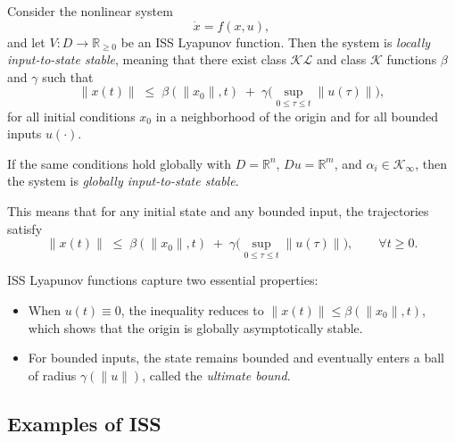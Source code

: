 \begin{theorem}
Consider the nonlinear system
\begin{equation}
    \dot{x} = f(x,u),
\end{equation}
and let $V:D\to\mathbb{R}_{\ge 0}$ be an ISS Lyapunov function. Then the system is 
\emph{locally input-to-state stable}, meaning that there exist class $\mathcal{KL}$ 
and class $\mathcal{K}$ functions $\beta$ and $\gamma$ such that
\begin{equation}
    \|x(t)\| \;\leq\; \beta(\|x_0\|,t) \;+\; 
    \gamma\!\Big(\sup_{0\le \tau \le t}\|u(\tau)\|\Big),
\end{equation}
for all initial conditions $x_0$ in a neighborhood of the origin and for all bounded 
inputs $u(\cdot)$.  
\end{theorem}

\begin{theorem}
If the same conditions hold globally with $D = \mathbb{R}^n$, $Du = \mathbb{R}^m$, 
and $\alpha_i \in \mathcal{K}_\infty$, then the system is 
\emph{globally input-to-state stable}.  

This means that for any initial state and any bounded input, the trajectories satisfy
\begin{equation}
\|x(t)\| \;\leq\; \beta(\|x_0\|,t) \;+\; 
\gamma\!\Big(\sup_{0\le \tau \le t}\|u(\tau)\|\Big), 
\qquad \forall t\ge 0.
\end{equation}
\end{theorem}

\begin{remark}
ISS Lyapunov functions capture two essential properties:
\begin{itemize}
    \item When $u(t)\equiv 0$, the inequality reduces to 
    $\|x(t)\|\leq \beta(\|x_0\|,t)$, which shows that the origin is globally asymptotically stable.
    \item For bounded inputs, the state remains bounded and eventually enters a ball of radius $\gamma(\|u\|)$, called the \emph{ultimate bound}.
\end{itemize}
\end{remark}

\subsection{Examples of ISS}

